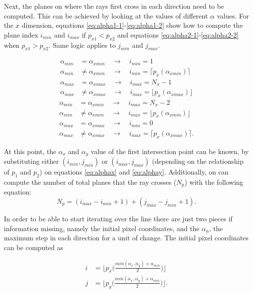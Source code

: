  Next, the planes on where the rays first cross in each direction need to be computed. This can be achieved by looking at the values of different $\alpha$ values. For the $x$ dimension, equations \ref{eq:alpha1-1}-\ref{eq:alpha1-2} show how to compute the plane index $i_{min}$ and $i_{max}$ if $p_{x1}<p_{x2}$ and equations \ref{eq:alpha2-1}-\ref{eq:alpha2-2} when $p_{x1}>p_{x2}$. Same logic applies to $j_{min}$ and $j_{max}$.

\begin{align}
\alpha_{min}&=\alpha_{xmin}\quad \rightarrow\quad i_{min}=1 \label{eq:alpha1-1}
\\
\alpha_{min}&\neq\alpha_{xmin}\quad \rightarrow\quad i_{min}=\lceil{ p_x(\alpha_{xmin})}\rceil \\
\alpha_{max}&=\alpha_{xmax}\quad \rightarrow\quad i_{max}=N_x-1\\
\alpha_{max}&\neq\alpha_{xmax}\quad \rightarrow\quad i_{max}=\lfloor{ p_x(\alpha_{xmax})}\rfloor 
\label{eq:alpha1-2}
\end{align}
\begin{align}
\alpha_{min}&=\alpha_{xmin}\quad \rightarrow\quad i_{max}=N_x-2 \label{eq:alpha2-1}\\
\alpha_{min}&\neq\alpha_{xmin}\quad \rightarrow\quad i_{max}=\lfloor{ p_x(\alpha_{xmin})}\rfloor \\
\alpha_{max}&=\alpha_{xmax} \quad\rightarrow\quad i_{min}=0\\
\alpha_{max}&\neq\alpha_{xmax} \quad\rightarrow\quad i_{max}=\lceil{ p_x(\alpha_{xmax})}\rceil .
\label{eq:alpha2-2}
\end{align}

At this point, the $\alpha_x$ and $\alpha_y$ value of the first intersection point can be known, by substituting either $(i_{min},j_{min})$ or $(i_{max},j_{max})$ (depending on the relationship of $p_1$ and $p_2$) on equations \ref{eq:alphax} and \ref{eq:alphay}. Additionally, on can compute the number of total planes that the ray crosses ($N_p$) with the following equation:
\begin{equation}
N_p=(i_{max}-i_{min}+1)+(j_{max}-j_{min}+1).
\end{equation}

In order to be able to start iterating over the line there are just two pieces if information missing, namely the initial pixel coordinates, and the $\alpha_u$, the maximum step in each direction for a unit of change. The initial pixel coordinates can be computed as

\begin{align}
i&=\bigg\lfloor{p_x\Big(\frac{min(\alpha_x,\alpha_y)+\alpha_{min}}{2}\Big)}\bigg\rfloor\\
j&=\bigg\lfloor{p_y\Big(\frac{min(\alpha_x,\alpha_y)+\alpha_{min}}{2}\Big)}\bigg\rfloor.
\end{align}

